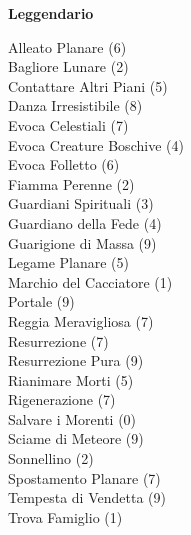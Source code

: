 \begin{multicols}{3}
{	\medskip\textbf{Leggendario}\medskip

	Alleato Planare (6)\\
	Bagliore Lunare (2)\\
	Contattare Altri Piani (5)\\
	Danza Irresistibile (8)\\
	Evoca Celestiali (7)\\
	Evoca Creature Boschive (4)\\
	Evoca Folletto (6)\\
	Fiamma Perenne (2)\\
	Guardiani Spirituali (3)\\
	Guardiano della Fede (4)\\
	Guarigione di Massa (9)\\
	Legame Planare (5)\\
	Marchio del Cacciatore (1)\\
	Portale (9)\\
	Reggia Meravigliosa (7)\\
	Resurrezione (7)\\
	Resurrezione Pura (9)\\
	Rianimare Morti (5)\\
	Rigenerazione (7)\\
	Salvare i Morenti (0)\\
	Sciame di Meteore (9)\\
	Sonnellino (2)\\
	Spostamento Planare (7)\\
	Tempesta di Vendetta (9)\\
	Trova Famiglio (1)\\

}
\end{multicols}